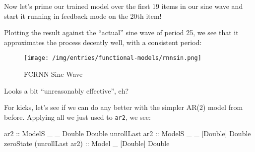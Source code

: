 \documentclass[]{article}
\newenvironment{Shaded}{}{}
\newcommand{\CommentTok}[1]{\textcolor[rgb]{0.38,0.63,0.69}{\textit{#1}}}
\newcommand{\DataTypeTok}[1]{\textcolor[rgb]{0.56,0.13,0.00}{#1}}
\newcommand{\DecValTok}[1]{\textcolor[rgb]{0.25,0.63,0.44}{#1}}
\newcommand{\FloatTok}[1]{\textcolor[rgb]{0.25,0.63,0.44}{#1}}
\newcommand{\FunctionTok}[1]{\textcolor[rgb]{0.02,0.16,0.49}{#1}}
\newcommand{\KeywordTok}[1]{\textcolor[rgb]{0.00,0.44,0.13}{\textbf{#1}}}
\newcommand{\NormalTok}[1]{#1}
\newcommand{\OtherTok}[1]{\textcolor[rgb]{0.00,0.44,0.13}{#1}}
\begin{document}
Now let's prime our trained model over the first 19 items in our sine wave and
start it running in feedback mode on the 20th item!

\begin{Shaded}
\end{Shaded}

Plotting the result against the ``actual'' sine wave of period 25, we see that
it approximates the process decently well, with a consistent period:

\begin{figure}
\centering
\texttt{[image: /img/entries/functional-models/rnnsin.png]}
\caption{FCRNN Sine Wave}
\end{figure}

Looks a bit ``unreasonably effective'', eh?

For kicks, let's see if we can do any better with the simpler AR(2) model from
before. Applying all we just used to \texttt{ar2}, we see:

\begin{Shaded}
\begin{Highlighting}[]
\OtherTok{ar2                        ::} \DataTypeTok{ModelS}\NormalTok{ _ _  }\DataTypeTok{Double}  \DataTypeTok{Double}
\NormalTok{unrollLast}\OtherTok{ ar2             ::} \DataTypeTok{ModelS}\NormalTok{ _ _ [}\DataTypeTok{Double}\NormalTok{] }\DataTypeTok{Double}
\NormalTok{zeroState (unrollLast ar2)}\OtherTok{ ::} \DataTypeTok{Model}\NormalTok{  _   [}\DataTypeTok{Double}\NormalTok{] }\DataTypeTok{Double}
\end{Highlighting}
\end{Shaded}
\end{document}
